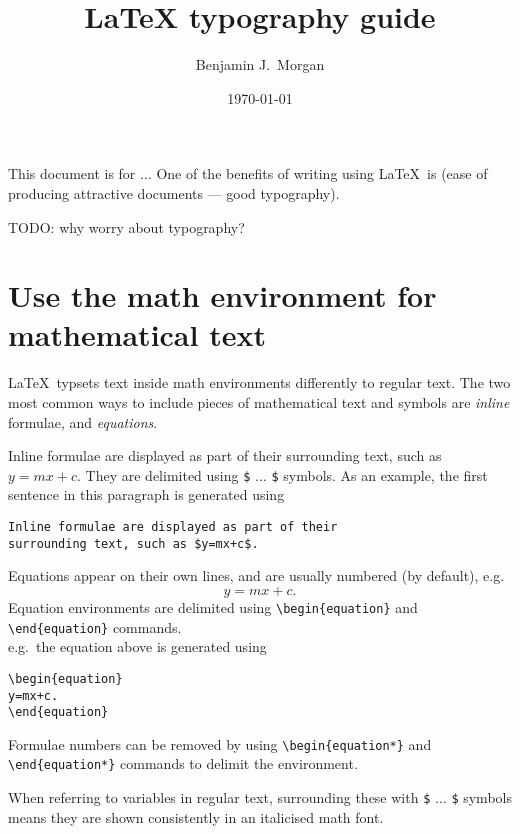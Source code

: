 \documentclass[a4paper]{tufte-handout}
\title{LaTeX typography guide}
\author{Benjamin J.\ Morgan}
\date{\today}
\begin{document}
\maketitle

This document is for $\ldots$ One of the benefits of writing using \LaTeX\ is (ease of producing attractive documents --- good typography).

TODO: why worry about typography?
\newpage

\tableofcontents

\newpage

\section{Use the math environment for mathematical text}
\LaTeX\ typsets text inside math environments differently to regular text. The two most common ways to include pieces of mathematical text and symbols are \emph{inline} formulae, and \emph{equations}.

Inline formulae are displayed as part of their surrounding text, such as $y=mx+c$. They are delimited using \lstinline{$} $\ldots$ \lstinline{$} symbols.
As an example, the first sentence in this paragraph is generated using
\begin{lstlisting}
Inline formulae are displayed as part of their
surrounding text, such as $y=mx+c$.
\end{lstlisting}

Equations appear on their own lines, and are usually numbered (by default), e.g.
\begin{equation}
y=mx+c.
\end{equation}
Equation environments are delimited using \lstinline$\begin{equation}$ and \lstinline$\end{equation}$ commands. \\
e.g.\ the equation above is generated using
\begin{lstlisting}
\begin{equation}
y=mx+c.
\end{equation}
\end{lstlisting}
Formulae numbers can be removed by using \lstinline$\begin{equation*}$ and \lstinline$\end{equation*}$ commands to delimit the environment.

When referring to variables in regular text, surrounding these with \lstinline{$} $\ldots$ \lstinline{$} symbols means they are shown consistently in an italicised math font.
\end{document}

